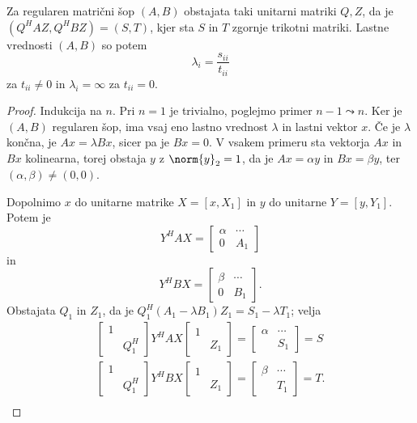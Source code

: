
\begin{izrek}
  Za regularen matrični šop $(A,B)$ obstajata taki unitarni matriki $Q,Z$, da je
  $(Q^H A Z, Q^H B Z) = (S,T)$, kjer sta $S$ in $T$ zgornje trikotni matriki.
  Lastne vrednosti $(A,B)$ so potem
  \[
	\lambda_i = \frac{s_{ii}}{t_{ii}}
  \]
  za $t_{ii} \ne 0$ in $\lambda_i = \infty$ za $t_{ii} = 0$.
\end{izrek}

\begin{proof}
  Indukcija na $n$.
  Pri $n = 1$ je trivialno, poglejmo primer $n-1 \leadsto n$.
  Ker je $(A,B)$ regularen šop, ima vsaj eno lastno vrednost $\lambda$ in lastni
  vektor $x$.
  Če je $\lambda$ končna, je $Ax = \lambda B x$, sicer pa je $Bx = 0$.
  V vsakem primeru sta vektorja $Ax$ in $Bx$ kolinearna, torej obstaja $y$ z
  $\norm{y}_2 = 1$, da je $Ax = \alpha y$ in $Bx = \beta y$, ter $(\alpha,
  \beta) \ne (0,0)$.

  Dopolnimo $x$ do unitarne matrike $X = [x, X_1]$ in $y$ do unitarne $Y = [y,
  Y_1]$.
  Potem je
  \[
	Y^H A X =
	\begin{bmatrix}
	  \alpha & \cdots \\
	  0 & A_1
	\end{bmatrix}
  \]
  in
  \[
	Y^H B X =
	\begin{bmatrix}
	  \beta & \cdots \\
	  0 & B_1
	\end{bmatrix}.
  \]
  Obstajata $Q_1$ in $Z_1$, da je $Q_1^H (A_1 - \lambda B_1) Z_1 = S_1 - \lambda
  T_1$; velja
  \begin{gather*}
	\begin{bmatrix}
	  1 & \\ & Q_1^H
	\end{bmatrix}
	Y^H A X
	\begin{bmatrix}
	  1 & \\ & Z_1
	\end{bmatrix}
	=
	\begin{bmatrix}
	  \alpha & \cdots \\
	  & S_1
	\end{bmatrix}
	= S \\
	\begin{bmatrix}
	  1 & \\ & Q_1^H
	\end{bmatrix}
	Y^H B X
	\begin{bmatrix}
	  1 & \\ & Z_1
	\end{bmatrix}
	=
	\begin{bmatrix}
	  \beta & \cdots \\
	  & T_1
	\end{bmatrix}
	= T. \\
  \end{gather*}
\end{proof}

